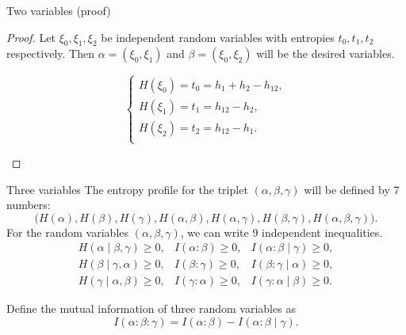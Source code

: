 \documentclass[handout,aspectratio=169]{beamer}
\begin{document}
    \begin{frame}{Two variables (proof)}
		\begin{proof}
		    Let \(\xi_0, \xi_1, \xi_2\) be independent random variables with entropies \(t_0, t_1, t_2\) respectively. Then \(\alpha = (\xi_0, \xi_1)\) and \(\beta = (\xi_0, \xi_2)\) will be the desired variables.\bigskip
		
		    \begin{center} \mbox{}\hfill
		    \parbox{.4\textwidth}{\centering{}}\hfill
		    	\parbox{.5\textwidth}{
		            \[
		            \begin{cases}
		                H(\xi_0) = t_0 = h_1 + h_2 - h_{12},\\
		                H(\xi_1) = t_1 = h_{12} - h_{2},\\
		                H(\xi_2) = t_2 = h_{12} - h_{1}.\\
		            \end{cases}
		            \]\qedhere}
		    \end{center}
		\end{proof}
    \end{frame}

    \begin{frame}{Three variables}
		The entropy profile for the triplet \((\alpha, \beta, \gamma)\) will be defined by 7 numbers:
		\[
		\bigl(H(\alpha), H(\beta), H(\gamma), H(\alpha, \beta), H(\alpha, \gamma),
		H(\beta, \gamma), H(\alpha, \beta, \gamma)\bigr).
		\]
		For the random variables \((\alpha, \beta, \gamma)\), we can write 9 independent inequalities.
		\begin{equation*}
		\begin{array}{lll}
		H(\alpha \mid \beta, \gamma) \ge 0, & I(\alpha : \beta) \ge 0, & I(\alpha : \beta \mid \gamma) \ge 0,\\
		H(\beta \mid \gamma, \alpha) \ge 0, & I(\beta : \gamma) \ge 0, & I(\beta : \gamma \mid \alpha) \ge 0,\\
		H(\gamma \mid \alpha, \beta) \ge 0, & I(\gamma : \alpha) \ge 0, & I(\gamma : \alpha \mid \beta) \ge 0.
		\end{array}
		\end{equation*}
		\begin{definition}
		Define the mutual information of three random variables as
		\[
		    I(\alpha : \beta : \gamma) = I(\alpha : \beta) - I(\alpha : \beta \mid \gamma).
		\]
		\end{definition}
    \end{frame}
\end{document}
